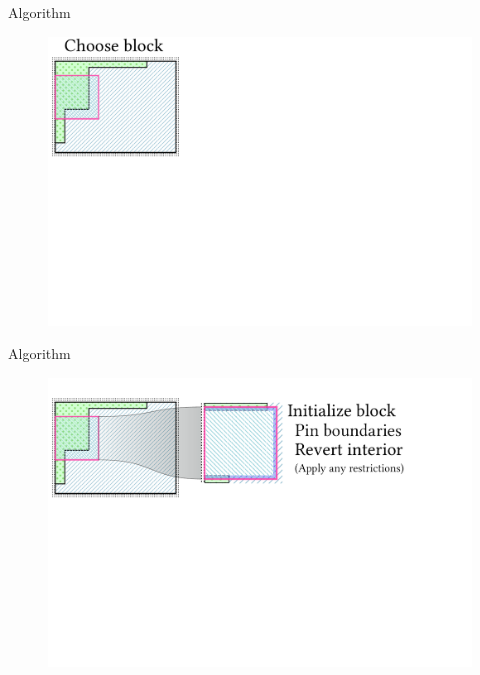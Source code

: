\documentclass{beamer}
\begin{document}
  \begin{frame}[fragile]{Algorithm}
    \begin{figure}
      \includegraphics[width=\textwidth]{figs/poms_alg1.pdf}
    \end{figure}
  \end{frame}

  \begin{frame}[fragile]{Algorithm}
    \begin{figure}
      \includegraphics[width=\textwidth]{figs/poms_alg2.pdf}
    \end{figure}
  \end{frame}
\end{document}
